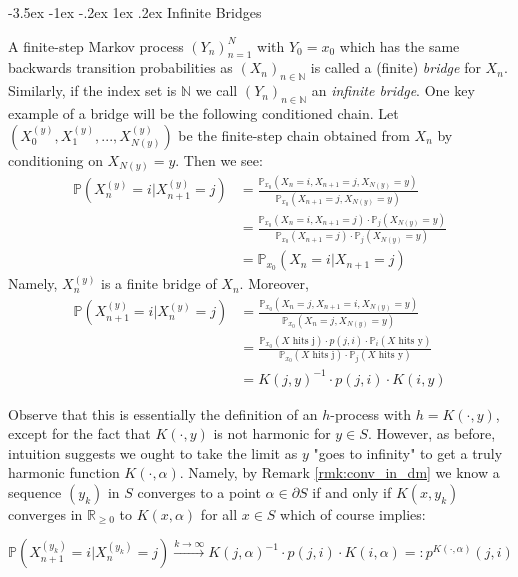 \documentclass[11pt,oneside,reqno]{article}
\makeatletter
\theoremstyle{plain}
\theoremstyle{definition}
\numberwithin{equation}{section}
\def\subsection#1{\@startsection {subsection}{2}{0pt}%
{-3.5ex \@plus -1ex \@minus -.2ex}%
{1ex \@plus.2ex}%
{\bf\mathversion{bold}}{#1}}
\renewcommand{\geq}{\geqslant}
\newcommand{\R}{\mathbb{R}}
\newcommand{\N}{\mathbb{N}}
\renewcommand{\P}{\mathbb{P}}
\makeatother
\begin{document}
\subsection{Infinite Bridges} \label{sec:infinite_bridges}

 \indent A finite-step Markov process $(Y_n)_{n = 1}^N$ with $Y_0 = x_0$ which has the same backwards transition probabilities as $(X_n)_{n \in \N}$ is called a (finite) \textit{bridge} for $X_n$. Similarly, if the index set is $\N$ we call $(Y_n)_{n \in \N}$ an \textit{infinite bridge}. One key example of a bridge will be the following conditioned chain. Let $(X^{(y)}_0, X^{(y)}_1, ..., X^{(y)}_{N(y)})$ be the finite-step chain obtained from $X_n$ by conditioning on $X_{N(y)} = y$. Then we see:
%
 \begin{align*}
     \P(X^{(y)}_n = i | X^{(y)}_{n+1} = j) & =  \frac{\P_{x_0}(X_n = i, X_{n+1} = j, X_{N(y)} = y)}{\P_{x_0}( X_{n+1} = j, X_{N(y)} = y)} \\
     & =  \frac{\P_{x_0}(X_n = i, X_{n+1} = j) \cdot \P_{j}( X_{N(y)} = y)}{\P_{x_0}( X_{n+1} = j) \cdot \P_j( X_{N(y)} = y)} \\
     & =  \P_{x_0}(X_n = i | X_{n+1} = j) 
 \end{align*}
% 
 Namely, $X^{(y)}_n$ is a finite bridge of $X_n$. Moreover, 
% 
 \begin{align*}
     \P(X^{(y)}_{n+1} = i | X^{(y)}_n = j) & =  \frac{\P_{x_0}(X_n = j, X_{n+1} = i, X_{N(y)} = y)}{\P_{x_0}( X_n=j, X_{N(y)} = y)} \\
     & = \frac{\P_{x_0}(X \text{ hits j}) \cdot p(j,i) \cdot \P_i(X \text{ hits y})}{\P_{x_0}(X \text{ hits j}) \cdot \P_j(X \text{ hits y})} \\ 
     & = K(j,y)^{-1}\cdot p(j,i) \cdot K( i, y) 
 \end{align*}

\noindent Observe that this is essentially the definition of an $h$-process with $h = K(\cdot, y)$, except for the fact that $K(\cdot, y)$ is not harmonic for $y \in S$. However, as before, intuition suggests we ought to take the limit as $y$ "goes to infinity" to get a truly harmonic function $K(\cdot, \alpha)$. Namely, by Remark \ref{rmk:conv_in_dm} we know a sequence $(y_k)$ in $S$ converges to a point $\alpha \in \partial S$ if and only if $K(x, y_k)$ converges in $\R_{\geq 0}$ to $K(x, \alpha)$ for all $x \in S$ which of course implies:

\[\P(X^{(y_k)}_{n+1} = i | X^{(y_k)}_n = j) \xrightarrow{k\to \infty} K(j,\alpha)^{-1}\cdot p(j,i) \cdot K( i, \alpha) =: p^{K(\cdot, \alpha)}(j,i)\]
\end{document}
